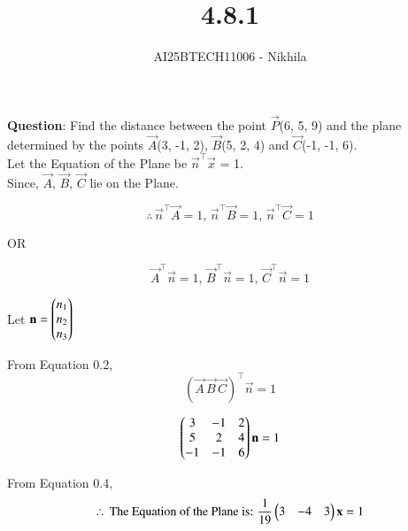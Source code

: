 \documentclass[journal]{IEEEtran}
\begin{document}

\vspace{3cm}

\title{4.8.1}
\author{AI25BTECH11006 - Nikhila}
{\let\newpage\relax\maketitle}

\renewcommand{\thefigure}{\theenumi}
\renewcommand{\thetable}{\theenumi}
\setlength{\intextsep}{10pt} 


\renewcommand{\thetable}{\theenumi}


\textbf{Question}: Find the distance between the point $\vec{P}$(6, 5, 9) and the plane determined by the points $\vec{A}$(3, -1, 2), $\vec{B}$(5, 2, 4) and $\vec{C}$(-1, -1, 6). \\


\solution
Let the Equation of the Plane be $\vec{n}^\top\vec{x}$ = 1.\\

Since, $\vec{A}, \, \vec{B}, \, \vec{C}$ lie on the Plane.

\begin{equation}
    \therefore \, \vec{n}^\top\vec{A}=1, \, \vec{n}^\top\vec{B}=1,  \, \vec{n}^\top\vec{C}=1
\end{equation}

\begin{center}
    OR
\end{center}

\begin{equation}
    \vec{A}^\top\vec{n}=1, \, \vec{B}^\top\vec{n}=1, \, \vec{C}^\top\vec{n}=1
\end{equation}

Let $\mathbf{n} = \begin{pmatrix}n_1 \\ n_2 \\ n_3\end{pmatrix}$

From Equation 0.2,
\begin{equation}
    (\vec{A} \, \vec{B} \, \vec{C})^\top \vec{n}=1
\end{equation}

\begin{equation}
\begin{pmatrix}3 & -1 & 2 \\ 5 & 2 & 4\\ -1 & -1 & 6\end{pmatrix}\mathbf{n} = 1
\end{equation}


From Equation 0.4,
\begin{equation}
\therefore \, \text{The Equation of the Plane is: } \dfrac{1}{19}\begin{pmatrix}3 & -4 & 3\end{pmatrix}\mathbf{x} = 1
\end{equation}\\
\end{document}
